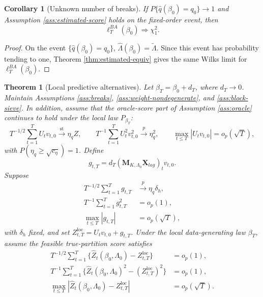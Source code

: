 \documentclass[12pt]{article}
\numberwithin{equation}{section}
\newtheorem{theorem}{Theorem}
\newtheorem{corollary}{Corollary}
\theoremstyle{definition}
\begin{document}
\begin{corollary}[Unknown number of breaks]
\label{cor:qhat}
If \(P\{\widehat q(\beta_0)=q_0\}\to1\) and Assumption \ref{ass:estimated-score} holds on the fixed-order event, then
\[
    \ell_T^{BA}(\beta_0)\Rightarrow\chi_1^2.
\]
\end{corollary}

\begin{proof}
On the event \(\{\widehat q(\beta_0)=q_0\}\), \(\widehat\Lambda(\beta_0)=\widetilde\Lambda\). Since this event has probability tending to one, Theorem \ref{thm:estimated-equiv} gives the same Wilks limit for \(\ell_T^{BA}(\beta_0)\).
\end{proof}

\begin{theorem}[Local predictive alternatives]
\label{thm:local-power}
Let \(\beta_T=\beta_0+d_T\), where \(d_T\to0\). Maintain Assumptions \ref{ass:breaks}, \ref{ass:weight-nondegenerate}, and \ref{ass:block-sieve}. In addition, assume that the oracle-score part of Assumption \ref{ass:oracle} continues to hold under the local law \(P_{\beta_T}\):
\[
    T^{-1/2}\sum_{t=1}^TU_tv_{t,0}
    \xrightarrow{\mathrm{st}}\eta_qZ,
    \qquad
    T^{-1}\sum_{t=1}^TU_t^2v_{t,0}^2
    \xrightarrow{p}\eta_q^2,
    \qquad
    \max_{t\leq T}|U_tv_{t,0}|=o_p(\sqrt T),
\]
with \(P(\eta_q\geq\sqrt{c_\eta})=1\). Define
\[
    g_{t,T}
    =
    d_T(\bm M_{K,\Lambda_0}\bm X_{lag})_tv_{t,0}.
\]
Suppose
\begin{align}
    T^{-1/2}\sum_{t=1}^Tg_{t,T}&\xrightarrow{p}\eta_q\delta_h,
    \label{eq:local-drift}\\
    T^{-1}\sum_{t=1}^Tg_{t,T}^2&=o_p(1),
    \label{eq:local-l2}\\
    \max_{t\leq T}|g_{t,T}|&=o_p(\sqrt T),
    \label{eq:local-max}
\end{align}
with \(\delta_h\) fixed, and set \(Z_{t,T}^{\mathrm{loc}}=U_tv_{t,0}+g_{t,T}\). Under the local data-generating law \(\beta_T\), assume the feasible true-partition score satisfies
\begin{align}
    T^{-1/2}\sum_{t=1}^T
    \{\widehat Z_t(\beta_0,\Lambda_0)-Z_{t,T}^{\mathrm{loc}}\}
    &=o_p(1),
    \label{eq:local-repl-num}\\
    T^{-1}\sum_{t=1}^T
    \{\widehat Z_t(\beta_0,\Lambda_0)^2-(Z_{t,T}^{\mathrm{loc}})^2\}
    &=o_p(1),
    \label{eq:local-repl-den}\\
    \max_{t\leq T}
    |\widehat Z_t(\beta_0,\Lambda_0)-Z_{t,T}^{\mathrm{loc}}|
    &=o_p(\sqrt T).
    \label{eq:local-repl-max}

\end{align}
\end{theorem}
\end{document}
